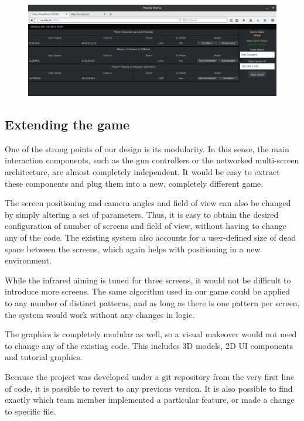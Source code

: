 \documentclass[a4paper,11pt]{article}
\begin{document}
\begin{figure}[ht]
	\centering
	\includegraphics[width=\textwidth]{images/admin_panel}
    \label{fig:admin_panel}
\end{figure}

\subsection{Extending the game}
One of the strong points of our design is its modularity. In this sense, the main interaction components, such as the gun controllers or the networked multi-screen architecture, are almost completely independent. It would be easy to extract these components and plug them into a new, completely different game.

The screen positioning and camera angles and field of view can also be changed by simply altering a set of parameters. Thus, it is easy to obtain the desired configuration of number of screens and field of view, without having to change any of the code. The existing system also accounts for a user-defined size of dead space between the screens, which again helps with positioning in a new environment.

While the infrared aiming is tuned for three screens, it would not be difficult to introduce more screens. The same algorithm used in our game could be applied to any number of distinct patterns, and as long as there is one pattern per screen, the system would work without any changes in logic.

The graphics is completely modular as well, so a visual makeover would not need to change any of the existing code. This includes 3D models, 2D UI components and tutorial graphics.

Because the project was developed under a git repository from the very first line of code, it is possible to revert to any previous version. It is also possible to find exactly which team member implemented a particular feature, or made a change to specific file.
\end{document}
